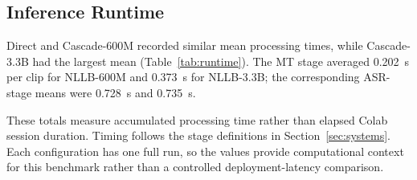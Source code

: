 \subsection{Inference Runtime}
\label{sec:runtime-results}

Direct and Cascade-600M recorded similar mean processing times, while
Cascade-3.3B had the largest mean (Table~\ref{tab:runtime}). The MT stage
averaged 0.202~s per clip for NLLB-600M and 0.373~s for NLLB-3.3B; the
corresponding ASR-stage means were 0.728~s and 0.735~s.

These totals measure accumulated processing time rather than elapsed Colab
session duration. Timing follows the stage definitions in
Section~\ref{sec:systems}. Each configuration has one full run, so the values
provide computational context for this benchmark rather than a controlled
deployment-latency comparison.
